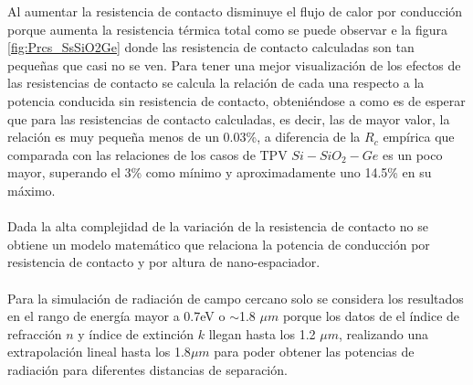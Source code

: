 Al aumentar la resistencia de contacto disminuye el flujo de calor por conducción porque aumenta la resistencia térmica total como se puede observar e la figura \ref{fig:Prcs_SsSiO2Ge} donde las resistencia de contacto calculadas son tan pequeñas que casi no se ven. Para tener una mejor visualización de los efectos de las resistencias de contacto se calcula la relación de cada una respecto a la potencia conducida sin resistencia de contacto, obteniéndose a como es de esperar que para las resistencias de contacto calculadas, es decir, las de mayor valor, la relación es muy pequeña menos de un 0.03\%, a diferencia de la $R_c$ empírica que comparada con las relaciones de los casos de TPV $Si-SiO_2-Ge$ es un poco mayor, superando el 3\% como mínimo y aproximadamente uno 14.5\% en su máximo.\\\\
Dada la alta complejidad de la variación de la resistencia de contacto no se obtiene un modelo matemático que relaciona la potencia de conducción por resistencia de contacto y por altura de nano-espaciador.\\\\
Para la simulación de radiación de campo cercano solo se considera los resultados en el rango de energía mayor a 0.7eV o $\sim$1.8 $\mu m$ porque los datos de el índice de refracción $n$ y índice de extinción $k$ llegan hasta los 1.2 $\mu m$, realizando una extrapolación lineal hasta los 1.8$\mu m$ para poder obtener las potencias de radiación para diferentes distancias de separación.
